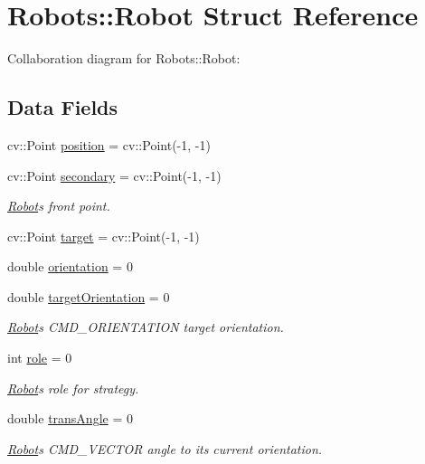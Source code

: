 \hypertarget{struct_robots_1_1_robot}{}\section{Robots\+:\+:Robot Struct Reference}
\label{struct_robots_1_1_robot}


Collaboration diagram for Robots\+:\+:Robot\+:
\subsection*{Data Fields}
\begin{DoxyCompactItemize}
\item 
cv\+::\+Point \hyperlink{struct_robots_1_1_robot_a94c80cc2e1bfad2bfcc12c0e3c463e68}{position} = cv\+::\+Point(-\/1, -\/1)
\item 
cv\+::\+Point \hyperlink{struct_robots_1_1_robot_aa704ae0b73b952e80f990c529abf1f9c}{secondary} = cv\+::\+Point(-\/1, -\/1)
\begin{DoxyCompactList}\small\item\em \hyperlink{struct_robots_1_1_robot}{Robot}\textquotesingle{}s front point. \end{DoxyCompactList}\item 
cv\+::\+Point \hyperlink{struct_robots_1_1_robot_a71780fa2401e52712b9bdc1699275063}{target} = cv\+::\+Point(-\/1, -\/1)
\item 
double \hyperlink{struct_robots_1_1_robot_aa2a6cb8cbdbbdeb8be6c6f552277b3e8}{orientation} = 0
\item 
double \hyperlink{struct_robots_1_1_robot_a6f2debee501324c946adf01dfddec728}{target\+Orientation} = 0
\begin{DoxyCompactList}\small\item\em \hyperlink{struct_robots_1_1_robot}{Robot}\textquotesingle{}s C\+M\+D\+\_\+\+O\+R\+I\+E\+N\+T\+A\+T\+I\+ON target orientation. \end{DoxyCompactList}\item 
int \hyperlink{struct_robots_1_1_robot_a8a6fa150b5dead69ab5a94ec92046f71}{role} = 0
\begin{DoxyCompactList}\small\item\em \hyperlink{struct_robots_1_1_robot}{Robot}\textquotesingle{}s role for strategy. \end{DoxyCompactList}\item 
double \hyperlink{struct_robots_1_1_robot_a7be046467fb2c4ad455c5394667be2ad}{trans\+Angle} = 0
\begin{DoxyCompactList}\small\item\em \hyperlink{struct_robots_1_1_robot}{Robot}\textquotesingle{}s C\+M\+D\+\_\+\+V\+E\+C\+T\+OR angle to its current orientation. \end{DoxyCompactList}\item 

\end{DoxyCompactItemize}
